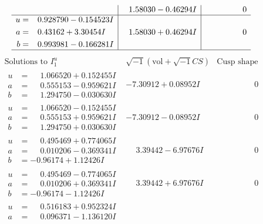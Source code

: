 \documentclass[1p]{elsarticle_modified}
\theoremstyle{definition}
\newcommand{\I}{\sqrt{-1}}
\begin{document}
$$\begin{array}{c|c|c}
 & \phantom{-}1.58030 - 0.46294 I & \phantom{-0.000000 } 0 \\ \hline\begin{aligned}
u &= \phantom{-}0.928790 - 0.154523 I \\
a &= \phantom{-}0.43162 + 3.30454 I \\
b &= \phantom{-}0.993981 - 0.166281 I\end{aligned}
 & \phantom{-}1.58030 + 0.46294 I & \phantom{-0.000000 } 0\\
 \hline 
 \end{array}$$\newpage$$\begin{array}{c|c|c}  
\text{Solutions to }I^u_{1}& \I (\text{vol} + \sqrt{-1}CS) & \text{Cusp shape}\\
 \hline 
\begin{aligned}
u &= \phantom{-}1.066520 + 0.152455 I \\
a &= \phantom{-}0.555153 - 0.959621 I \\
b &= \phantom{-}1.294750 - 0.030630 I\end{aligned}
 & -7.30912 + 0.08952 I & \phantom{-0.000000 } 0 \\ \hline\begin{aligned}
u &= \phantom{-}1.066520 - 0.152455 I \\
a &= \phantom{-}0.555153 + 0.959621 I \\
b &= \phantom{-}1.294750 + 0.030630 I\end{aligned}
 & -7.30912 - 0.08952 I & \phantom{-0.000000 } 0 \\ \hline\begin{aligned}
u &= \phantom{-}0.495469 + 0.774065 I \\
a &= \phantom{-}0.010206 - 0.369341 I \\
b &= -0.96174 + 1.12426 I\end{aligned}
 & \phantom{-}3.39442 - 6.97676 I & \phantom{-0.000000 } 0 \\ \hline\begin{aligned}
u &= \phantom{-}0.495469 - 0.774065 I \\
a &= \phantom{-}0.010206 + 0.369341 I \\
b &= -0.96174 - 1.12426 I\end{aligned}
 & \phantom{-}3.39442 + 6.97676 I & \phantom{-0.000000 } 0 \\ \hline\begin{aligned}
u &= \phantom{-}0.516183 + 0.952324 I \\
a &= \phantom{-}0.096371 - 1.136120 I \\

\end{aligned}
\end{array}$$
\end{document}
